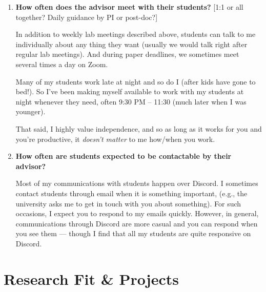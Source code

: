 \documentclass{article}
\begin{document}
\begin{enumerate}[label=\arabic*.]
    Sometimes we just relax and watch a movie (e.g., the PhD Movie).  
    
    Also, most of our communications happen on Discord server outside the meetings where we chat about research and other random things (e.g., plan for Thanksgiving party).

    \item \textbf{How often does the advisor meet with their students?} [1:1 or all together? Daily guidance by PI or post-doc?]  
    
    In addition to weekly lab meetings described above, students can talk to me individually about any thing they want (usually we would talk right after regular lab meetings). And during paper deadlines, we sometimes meet several times a day on Zoom.

    Many of my students work late at night and so do I (after kids have gone to bed!). So I've been making myself available to work with my students at night whenever they need, often 9:30 PM -- 11:30 (much later when I was younger).
    
    That said, I highly value independence, and so as long as it works for you and you're productive, it \textit{doesn't matter} to me how/when you work.


    \item \textbf{How often are students expected to be contactable by their advisor?}  
    
    Most of my communications with students happen over Discord. I sometimes contact students through email when it is something important, (e.g., the university asks me to get in touch with you about something). For such occasions, I expect you to respond to my emails quickly. However, in general, communications through Discord are more casual and you can respond when you see them --- though I find that all my students are quite responsive on Discord.


\end{enumerate}

\section{Research Fit \& Projects}
\end{document}
